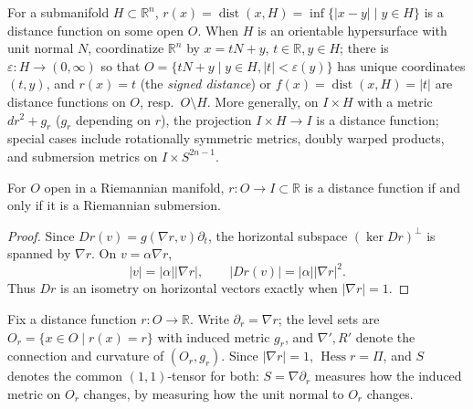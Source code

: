 \begin{example}
  \label{ex:pet-ch3-distance-to-submanifold}


  For a submanifold $H\subset\mathbb R^n$,
  $r(x)=\operatorname{dist}(x,H)=\inf\{|x-y|\mid y\in H\}$ is a distance function
  on some open $O$. When $H$ is an orientable hypersurface
  with unit normal $N$, coordinatize $\mathbb R^n$ by $x=tN+y$, $t\in\mathbb
  R,y\in H$; there is $\varepsilon:H\to(0,\infty)$ so that
  $O=\{tN+y\mid y\in H,|t|<\varepsilon(y)\}$ has unique coordinates $(t,y)$, and
  $r(x)=t$ (the \emph{signed distance}) or
  $f(x)=\operatorname{dist}(x,H)=|t|$ are distance functions on $O$, resp.\
  $O\setminus H$. More generally, on $I\times H$ with a metric
  $dr^2+g_r$ ($g_r$ depending on $r$), the projection $I\times H\to I$ is a
  distance function; special cases include rotationally symmetric metrics,
  doubly warped products, and submersion metrics on $I\times S^{2n-1}$.
\end{example}

\begin{lemma}
  \label{lem:pet-ch3-distance-function-submersion}


  For $O$ open in a Riemannian manifold, $r:O\to I\subset\mathbb R$ is a distance
  function if and only if it is a Riemannian submersion.
\end{lemma}
\begin{proof}

  \sketch
  Since
  $Dr(v)=g(\nabla r,v)\partial_t$, the horizontal subspace
  $(\ker Dr)^\perp$ is spanned by $\nabla r$. On $v=\alpha\nabla r$,
  \[
   |v|=|\alpha||\nabla r|,\qquad |Dr(v)|=|\alpha||\nabla r|^2.
  \]
  Thus $Dr$ is an isometry on horizontal vectors exactly when $|\nabla r|=1$.
\end{proof}

\begin{definition}[distance-function notation: $\partial_r,O_r,g_r,S$]
  \label{def:pet-ch3-distance-function-notation}


  Fix a distance function $r:O\to\mathbb R$. Write $\partial_r=\nabla r$; the
  level sets are $O_r=\{x\in O\mid r(x)=r\}$ with induced metric $g_r$, and
  $\nabla',R'$ denote the connection and curvature of $(O_r,g_r)$. Since
  $|\nabla r|=1$, $\operatorname{Hess}r=\Pi$, and $S$ denotes the common
  $(1,1)$-tensor for both: $S=\nabla\partial_r$ measures how the induced metric
  on $O_r$ changes, by measuring how the unit normal to $O_r$ changes.
\end{definition}

